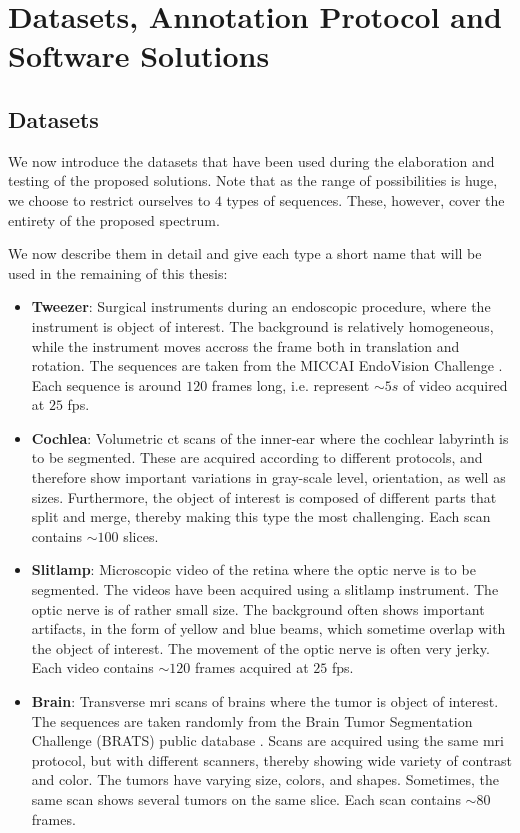 \chapter{Datasets, Annotation Protocol and Software Solutions}
\label{datasets}

\section{Datasets}

We now introduce the datasets that have been used during the elaboration and testing of the proposed solutions.
Note that as the range of possibilities is huge, we choose to restrict ourselves to $4$ types of sequences.
These, however, cover the entirety of the proposed spectrum.

We now describe them in detail and give each type a short name that will be used in the remaining of this thesis:

\begin{itemize}
  \item \textbf{Tweezer}: Surgical instruments during an endoscopic procedure, where the instrument is object of interest.
    The background is relatively homogeneous, while the instrument moves accross the frame both in translation and rotation.
    The sequences are taken from the MICCAI EndoVision Challenge \cite{EndoChall}.
    Each sequence is around $120$ frames long, i.e. represent $\sim 5s$ of video acquired at $25$ fps.
  \item \textbf{Cochlea}: Volumetric \Gls{ct} scans of the inner-ear where the cochlear labyrinth is to be segmented. These are acquired according to different protocols, and therefore show important variations in gray-scale level, orientation, as well as sizes. Furthermore, the object of interest is composed of different parts that split and merge, thereby making this type the most challenging.
    Each scan contains $\sim 100$ slices.
  \item \textbf{Slitlamp}: Microscopic video of the retina where the optic nerve is to be segmented. The videos have been acquired using a slitlamp instrument.
    The optic nerve is of rather small size. The background often shows important artifacts, in the form of yellow and blue beams, which sometime overlap with the object of interest. The movement of the optic nerve is often very jerky.
    Each video contains $\sim 120$ frames acquired at $25$ fps.
  \item \textbf{Brain}: Transverse \gls{mri} scans of brains where the tumor is object of interest. The sequences are taken randomly from the Brain Tumor Segmentation Challenge (BRATS) public database \cite{BRATSChall}.
    Scans are acquired using the same \gls{mri} protocol, but with different scanners, thereby showing wide variety of contrast and color.
    The tumors have varying size, colors, and shapes. Sometimes, the same scan shows several tumors on the same slice.
    Each scan contains $\sim 80$ frames.
\end{itemize}


